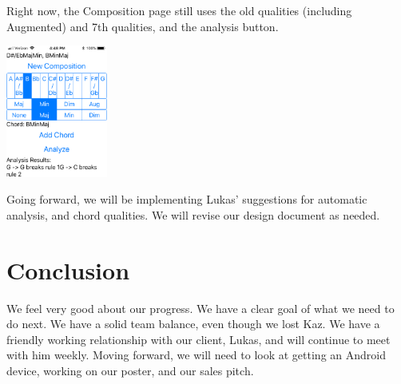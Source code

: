 \documentclass[onecolumn, draftclsnofoot,10pt, compsoc]{IEEEtran}
\begin{document}
Right now, the Composition page still uses the old qualities (including Augmented) and 7th qualities, and the analysis button.


\includegraphics[width=0.25\textwidth]{compose}

Going forward, we will be implementing Lukas’ suggestions for automatic analysis, and chord qualities.
We will revise our design document as needed.

\section{Conclusion}
We feel very good about our progress.
We have a clear goal of what we need to do next.
We have a solid team balance, even though we lost Kaz.
We have a friendly working relationship with our client, Lukas, and will continue to meet with him weekly.
Moving forward, we will need to look at getting an Android device, working on our poster, and our sales pitch.
\end{document}
